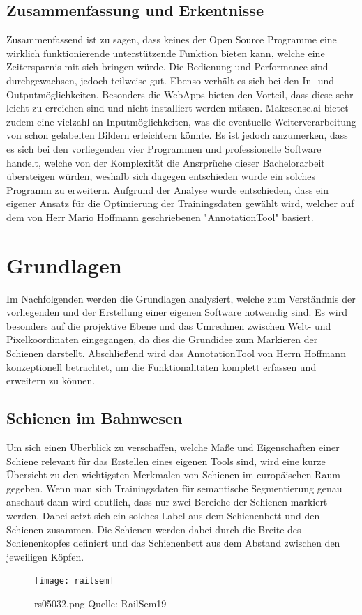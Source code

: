 \documentclass[11pt]{scrartcl}
\begin{document}
\subsection{Zusammenfassung und Erkentnisse}
\label{sec:Zusammenfassung und Erkentnisse}

\noindent
Zusammenfassend ist zu sagen, dass keines der Open Source Programme eine wirklich funktionierende unterstützende Funktion bieten kann, welche eine Zeitersparnis mit sich bringen würde. Die Bedienung und Performance sind durchgewachsen, jedoch teilweise gut. Ebenso verhält es sich bei den In- und Outputmöglichkeiten. Besonders die WebApps bieten den Vorteil, dass diese sehr leicht zu erreichen sind und nicht installiert werden müssen. Makesense.ai bietet zudem eine vielzahl an Inputmöglichkeiten, was die eventuelle Weiterverarbeitung von schon gelabelten Bildern erleichtern könnte. Es ist jedoch anzumerken, dass es sich bei den vorliegenden vier Programmen und professionelle Software handelt, welche von der Komplexität die Ansrprüche dieser Bachelorarbeit übersteigen würden, weshalb sich dagegen entschieden wurde ein solches Programm zu erweitern. Aufgrund der Analyse wurde entschieden, dass ein eigener Ansatz für die Optimierung der Trainingsdaten gewählt wird, welcher auf dem von Herr Mario Hoffmann geschriebenen "AnnotationTool" basiert.

\newpage

\section{Grundlagen}
\label{sec:Grundlagen}

Im Nachfolgenden werden die Grundlagen analysiert, welche zum Verständnis der vorliegenden und der Erstellung einer eigenen Software notwendig sind. Es wird besonders auf die projektive Ebene und das Umrechnen zwischen Welt- und Pixelkoordinaten eingegangen, da dies die Grundidee zum Markieren der Schienen darstellt. Abschließend wird das AnnotationTool von Herrn Hoffmann konzeptionell betrachtet, um die Funktionalitäten komplett erfassen und erweitern zu können.

\subsection{Schienen im Bahnwesen}
\label{sec:Schienen im Bahnwesen}

Um sich einen Überblick zu verschaffen, welche Maße und Eigenschaften einer Schiene relevant für das Erstellen eines eigenen Tools sind, wird eine kurze Übersicht zu den wichtigsten Merkmalen von Schienen im europäischen Raum gegeben.
\noindent
Wenn man sich Trainingsdaten für semantische Segmentierung genau anschaut dann wird deutlich, dass nur zwei Bereiche der Schienen markiert werden. Dabei setzt sich ein solches Label aus dem Schienenbett und den Schienen zusammen. Die Schienen werden dabei durch die Breite des Schienenkopfes definiert und das Schienenbett aus dem Abstand zwischen den jeweiligen Köpfen. 
\begin{figure}[H]
  \texttt{[image: railsem]}
  \caption{rs05032.png Quelle: RailSem19}
\end{figure}
\end{document}
